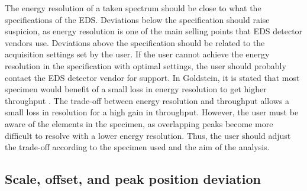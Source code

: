 The energy resolution of a taken spectrum should be close to what the specifications of the EDS.
Deviations below the specification should raise suspicion, as energy resolution is one of the main selling points that EDS detector vendors use.
Deviations above the specification should be related to the acquisition settings set by the user.
If the user cannot achieve the energy resolution in the specification with optimal settings, the user should probably contact the EDS detector vendor for support.
In Goldstein, it is stated that most specimen would benefit of a small loss in energy resolution to get higher throughput \cite[16.3.2]{goldstein_scanning_2018}.
The trade-off between energy resolution and throughput allows a small loss in resolution for a high gain in throughput.
However, the user must be aware of the elements in the specimen, as overlapping peaks become more difficult to resolve with a lower energy resolution.
Thus, the user should adjust the trade-off according to the specimen used and the aim of the analysis.










\subsection{Scale, offset, and peak position deviation}
\label{theory:eds_performance:scaleoffset}



